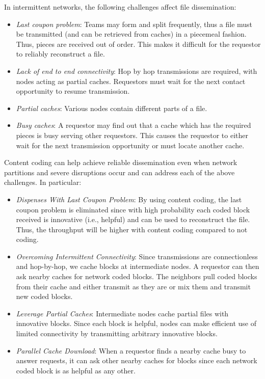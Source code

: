 In intermittent networks, the following challenges affect file dissemination:

\begin{itemize}
  \item \emph{Last coupon problem}: Teams may form and split frequently, thus a file must be transmitted (and can be retrieved from caches) in a piecemeal fashion. Thus, pieces are received out of order. This makes it difficult for the requestor to reliably reconstruct a file.
  \item \emph{Lack of end to end connectivity}: Hop by hop transmissions are required, with nodes acting as partial caches. Requestors must wait for the next contact opportunity to resume transmission.
  \item \emph{Partial caches}: Various nodes contain different parts of a file.
  \item \emph{Busy caches}: A requestor may find out that a cache which has the required pieces is busy serving other requestors. This causes the requestor to either wait for the next transmission opportunity or must locate another cache.
\end{itemize}

Content coding can help achieve reliable dissemination even when network partitions and severe disruptions occur and can address each of the above challenges. In particular:

\begin{itemize}
  \item \emph{Dispenses With Last Coupon Problem}: By using content coding, the last coupon problem is eliminated since with high probability each coded block received is innovative (i.e., helpful) and can be used to reconstruct the file. Thus, the throughput will be higher with content coding compared to not coding. 
\item \emph{Overcoming Intermittent Connectivity}: Since transmissions are connectionless and hop-by-hop, we cache blocks at intermediate nodes. A requestor can then ask nearby caches for network coded blocks. The neighbors pull coded blocks from their cache and either transmit as they are or mix them and transmit new coded blocks.
  \item \emph{Leverage Partial Caches}: Intermediate nodes cache partial files with innovative blocks. Since each block is helpful, nodes can make efficient use of limited connectivity by transmitting arbitrary innovative blocks.
   \item \emph{Parallel Cache Download}: When a requestor finds a nearby cache busy to answer requests, it can ask other nearby caches for blocks since each network coded block is as helpful as any other.
\end{itemize}


